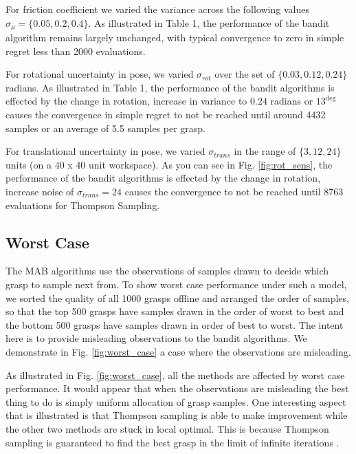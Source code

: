 \documentclass[journal,transmag]{IEEEtran}%
\begin{document}
For friction coefficient we varied the variance across the following values $\sigma_{\mu} = \lbrace 0.05, 0.2, 0.4 \rbrace$. As illustrated in Table 1, the performance of the bandit algorithm remains largely unchanged, with typical convergence to zero in simple regret less than 2000 evaluations.

For rotational uncertainty in pose, we varied $\sigma_{rot}$ over the set of $\lbrace 0.03, 0.12,0.24\rbrace$ radians. As illustrated in Table 1, the performance of the bandit algorithms is effected by the change in rotation, increase in variance to $0.24$ radians or $13^{\deg}$  causes the convergence in simple regret to not be reached until around 4432 samples or an average of 5.5 samples per grasp. 

For translational uncertainty in pose, we varied $\sigma_{trans}$ in the range of $\lbrace 3,12, 24 \rbrace$ units (on a 40 x 40 unit workspace). As you can see in Fig. \ref{fig:rot_sens}, the performance of the bandit algorithms is effected by the change in rotation, increase noise of $\sigma_{trans} = 24$ causes the convergence to not be reached until 8763 evaluations for Thompson Sampling. 



\subsection{Worst Case}
The MAB algorithms use the observations of samples drawn to decide which grasp to sample next from. To show worst case performance under such a model, we sorted the quality of all 1000 grasps offline and arranged the order of samples, so that the top 500 grasps have samples drawn in the order of worst to best and the bottom 500 grasps have samples drawn in order of best to worst. The intent here is to provide misleading observations to the bandit algorithms. We demonstrate in Fig. \ref{fig:worst_case} a case where the observations are misleading. 

As illustrated in Fig. \ref{fig:worst_case}, all the methods are affected by worst case performance. It would appear that when the observations are misleading the best thing to do is simply uniform allocation of grasp samples. One interesting aspect that is illustrated is that Thompson sampling is able to make improvement while the other two methods are stuck in local optimal. This is because Thompson sampling is guaranteed to find the best grasp in the limit of infinite iterations \cite{agrawal2011analysis}.
\end{document}
